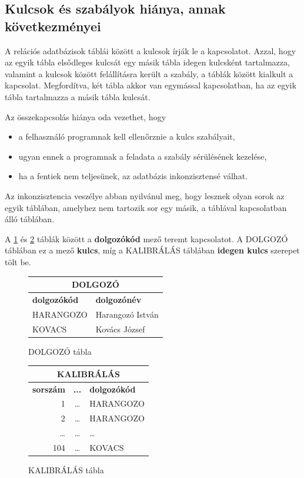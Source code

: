 \documentclass[a4paper,12pt]{report}
\begin{document}
\subsection{Kulcsok és szabályok hiánya, annak következményei}
A relációs adatbázisok táblái között a kulcsok írják le a kapcsolatot. Azzal, 
hogy az egyik tábla elsődleges kulcsát egy másik tábla idegen kulcsként 
tartalmazza, valamint a kulcsok között felállításra került a szabály, a táblák 
között kialkult a kapcsolat. Megfordítva, két tábla akkor van egymással 
kapcsolatban, ha az egyik tábla tartalmazza a másik tábla kulcsát.

Az összekapcsolás hiánya oda vezethet, hogy
\begin{itemize}
\item a felhasználó programnak kell ellenőrznie a kulcs szabályait,
\item ugyan ennek a programnak a feladata a szabály sérülésének kezelése,
\item ha a fentiek nem teljesünek, az adatbázis inkonzisztensé válhat.
\end{itemize}

Az inkonzisztencia veszélye abban nyilvánul meg, hogy lesznek olyan sorok az 
egyik táblában, amelyhez nem tartozik sor egy másik, a táblával kapcsolatban 
álló táblában.

A \ref{dolg} és \ref{kalib} táblák között a \textbf{dolgozókód} mező teremt
kapcsolatot. A DOLGOZÓ táblában ez a mező \textbf{kulcs}, míg a KALIBRÁLÁS 
táblában \textbf{idegen kulcs} szerepet tölt be.

\begin{figure}[ht!] \centering
\begin{tabular}{|l|l|}
        \hline
        \multicolumn{2}{|c|}{\textbf{DOLGOZÓ}}\\
        \hline
        \textbf{dolgozókód}&\textbf{dolgozónév}\\
        \hline
        HARANGOZO&Harangozó István\\
        \hline
        KOVACS&Kovács József\\
        \hline
        \end{tabular}
        \caption{DOLGOZÓ tábla}\label{dolg}
\end{figure}

\begin{figure}[ht!]\centering

\begin{tabular}{|r|c|l|}
        \hline
        \multicolumn{3}{|c|}{\textbf{KALIBRÁLÁS}}\\
        \hline
        \textbf{sorszám}&\textbf{...}&\textbf{dolgozókód}\\
        \hline
        1&\dots&HARANGOZO\\
        \hline
        2&\dots&HARANGOZO\\
        \hline
        \dots&\dots&\dots\\
        \hline
        104&\dots&KOVACS\\
\end{tabular}
\caption{KALIBRÁLÁS tábla}\label{kalib}
\end{figure}
        
\end{document}
